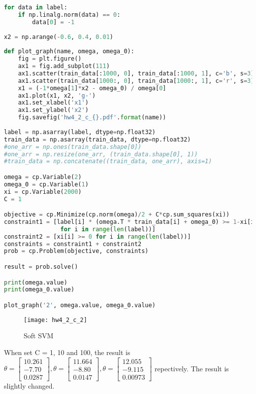 \documentclass[11pt]{article}
\begin{document}
\begin{enumerate}[label=(\alph*)]
\begin{enumerate}[label=(\roman*)]
\begin{lstlisting}[language=Python, showstringspaces=false]
for data in label:
    if np.linalg.norm(data) == 0:
        data[0] = -1
        
x2 = np.arange(-0.6, 0.4, 0.01)
        
def plot_graph(name, omega, omega_0):
    fig = plt.figure()
    ax1 = fig.add_subplot(111)
    ax1.scatter(train_data[:1000, 0], train_data[:1000, 1], c='b', s=3)
    ax1.scatter(train_data[1000:, 0], train_data[1000:, 1], c='r', s=3)
    x1 = (-1*omega[1]*x2 - omega_0) / omega[0]
    ax1.plot(x1, x2, 'g-')
    ax1.set_xlabel('x1')
    ax1.set_ylabel('x2')
    fig.savefig('hw4_2_c_{}.pdf'.format(name))
        
label = np.asarray(label, dtype=np.float32)
train_data = np.asarray(train_data, dtype=np.float32)
#one_arr = np.ones(train_data.shape[0])
#one_arr = np.resize(one_arr, (train_data.shape[0], 1))
#train_data = np.concatenate((train_data, one_arr), axis=1)

omega = cp.Variable(2)
omega_0 = cp.Variable(1)
xi = cp.Variable(2000)
C = 1

objective = cp.Minimize(cp.norm(omega)/2 + C*cp.sum_squares(xi))
constraint1 = [label[i] * (omega.T * train_data[i] + omega_0) >= 1-xi[i] 
                for i in range(len(label))] 
constraint2 = [xi[i] >= 0 for i in range(len(label))]
constraints = constraint1 + constraint2
prob = cp.Problem(objective, constraints)

result = prob.solve()

print(omega.value)
print(omega_0.value)

plot_graph('2', omega.value, omega_0.value)
\end{lstlisting}

\begin{figure}[H]
\centering
\texttt{[image: hw4\_2\_c\_2]}
\caption{Soft SVM}
\label{fig:hw4_2_c_2}
\end{figure}


When set C = 1, 10 and 100, the result is $
\theta = 
\begin{bmatrix}
10.261 \\ -7.70 \\ 0.0287
\end{bmatrix} ,
\theta = 
\begin{bmatrix}
11.664 \\ -8.80 \\ 0.0147
\end{bmatrix},
\theta = 
\begin{bmatrix}
12.055 \\ -9.115 \\ 0.00973
\end{bmatrix} $ repectively. The result is slightly changed. 


\end{enumerate}
\end{enumerate}
\end{document}
